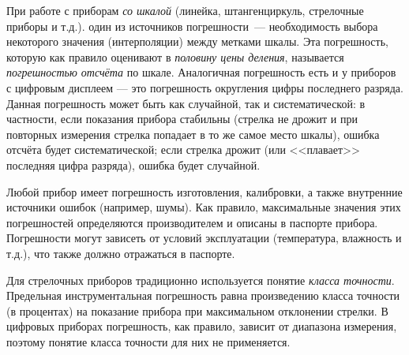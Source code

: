 При работе с приборам \emph{со шкалой} (линейка, штангенциркуль, стрелочные
приборы и т.д.). один из источников погрешности~--- необходимость
выбора некоторого значения (интерполяции) между метками шкалы. Эта
погрешность, которую как правило оценивают в \emph{половину цены деления},
называется\emph{ погрешностью отсчёта} по шкале. Аналогичная погрешность
есть и у приборов с цифровым дисплеем --- это погрешность
округления цифры последнего разряда. Данная погрешность может быть
как случайной, так и систематической: в частности, если показания
прибора стабильны (стрелка не дрожит и при повторных измерения стрелка
попадает в то же самое место шкалы), ошибка отсчёта будет систематической;
если стрелка дрожит (или <<плавает>> последняя
цифра разряда), ошибка будет случайной. 



Любой прибор имеет погрешность изготовления, калибровки, а также внутренние
источники ошибок (например, шумы). Как правило, максимальные значения
этих погрешностей определяются производителем и описаны в паспорте
прибора. Погрешности могут зависеть от условий эксплуатации (температура,
влажность и т.д.), что также должно отражаться в паспорте. 


Для стрелочных приборов традиционно используется понятие \emph{класса
точности}. Предельная инструментальная погрешность равна произведению
класса точности (в процентах) на показание прибора при максимальном
отклонении стрелки. В цифровых приборах погрешность, как правило,
зависит от диапазона измерения, поэтому понятие класса точности для
них не применяется.

